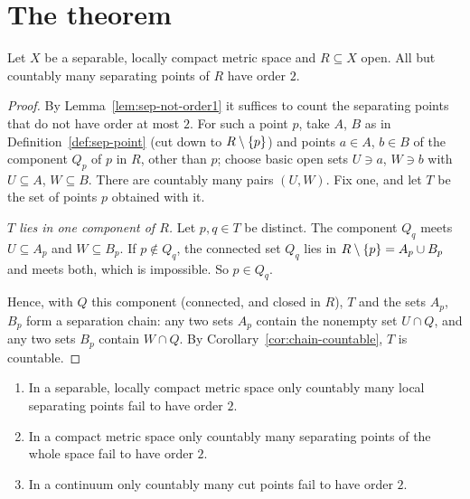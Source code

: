 \section{The theorem}

\begin{theorem}\label{thm:sep-order}
Let $X$ be a separable, locally compact metric space and $R\subseteq X$ open. All but countably many separating points of $R$ have order $2$.
\end{theorem}

\begin{proof}
By Lemma~\ref{lem:sep-not-order1} it suffices to count the separating points that do not have order at most $2$. For such a point $p$, take $A$, $B$ as in
Definition~\ref{def:sep-point} (cut down to $R\setminus\left\{ p \right\}$) and points $a\in A$, $b\in B$ of the component $Q_p$ of $p$ in $R$, other than $p$; choose basic open sets
$U\ni a$, $W\ni b$ with $U\subseteq A$, $W\subseteq B$. There are countably many pairs $(U,W)$. Fix one, and let $T$ be the set of points $p$ obtained with it.

\emph{$T$ lies in one component of $R$.} Let $p,q\in T$ be distinct. The component $Q_q$ meets $U\subseteq A_p$ and $W\subseteq B_p$. If $p\notin Q_q$, the connected set $Q_q$
lies in $R\setminus\left\{ p \right\}=A_p\cup B_p$ and meets both, which is impossible. So $p\in Q_q$.

Hence, with $Q$ this component (connected, and closed in $R$), $T$ and the sets $A_p$, $B_p$ form a separation chain: any two sets $A_p$ contain the nonempty set
$U\cap Q$, and any two sets $B_p$ contain $W\cap Q$. By Corollary~\ref{cor:chain-countable}, $T$ is countable.
\end{proof}


\begin{corollary}[Whyburn (3.2), (8.4), (9.2)]\label{cor:whyburn}
\leavevmode
\begin{enumerate}[label=(\alph*)]
\item In a separable, locally compact metric space only countably many local separating points fail to have order $2$.
\item In a compact metric space only countably many separating points of the whole space fail to have order $2$.
\item In a continuum only countably many cut points fail to have order $2$.
\end{enumerate}
\end{corollary}

